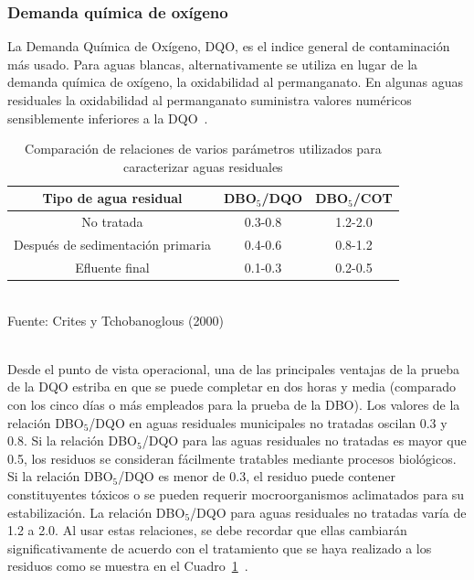 \subsubsection*{Demanda química de oxígeno}
La Demanda Química de Oxígeno, DQO, es el indice general de contaminación más usado. Para aguas blancas, alternativamente se utiliza en lugar de la demanda química de oxígeno, la oxidabilidad al permanganato. En algunas aguas residuales la oxidabilidad al permanganato suministra valores numéricos sensiblemente inferiores a la DQO~\emph{\citep{manuel13}}.\\
	\begin{table}[h]
	\begin{center}
	\caption{Comparación de relaciones de varios parámetros utilizados para caracterizar aguas residuales}
	\label{tab:comparacion}
		\begin{footnotesize}
		\begin{tabular}{ | c  c  c |}
			\hline
			\textbf{Tipo de agua residual} & DBO$_{5}$/DQO & DBO$_{5}$/COT \\
			\hline
			No tratada & 0.3-0.8 & 1.2-2.0 \\
			Después de sedimentación primaria & 0.4-0.6 & 0.8-1.2 \\
			Efluente final & 0.1-0.3 & 0.2-0.5 \\
			\hline
		\end{tabular}
		\\{\small{Fuente: Crites y Tchobanoglous (2000)}}
		\end{footnotesize}
	\end{center}
	\end{table}
\\Desde el punto de vista operacional, una de las principales ventajas de la prueba de la DQO estriba en que se puede completar en dos horas y media (comparado con los cinco días o más empleados para la prueba de la DBO).
Los valores de la relación DBO$_{5}$/DQO en aguas residuales municipales no tratadas oscilan 0.3 y 0.8. Si la relación DBO$_{5}$/DQO para las aguas residuales no tratadas es mayor que 0.5, los residuos se consideran fácilmente tratables mediante procesos biológicos. Si la relación DBO$_{5}$/DQO es menor de 0.3, el residuo puede contener constituyentes tóxicos o se pueden requerir mocroorganismos aclimatados para su estabilización. La relación DBO$_{5}$/DQO para aguas residuales no tratadas varía de 1.2 a 2.0. Al usar estas relaciones, se debe recordar que ellas cambiarán significativamente de acuerdo con el tratamiento que se haya realizado a los residuos como se muestra en el Cuadro~\ref{tab:comparacion}~\emph{\citep{ron}}.
